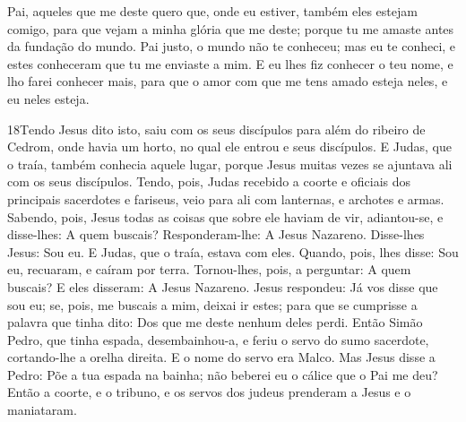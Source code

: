 Pai, aqueles que me deste quero que, onde eu estiver, também eles
estejam comigo, para que vejam a minha glória que me deste; porque
tu me amaste antes da fundação do mundo. Pai justo, o mundo
não te conheceu; mas eu te conheci, e estes conheceram que tu me
enviaste a mim. E eu lhes fiz conhecer o teu nome, e lho
farei conhecer mais, para que o amor com que me tens amado esteja
neles, e eu neles esteja.

\medskip

\lettrine{18} Tendo Jesus dito isto, saiu com os seus
discípulos para além do ribeiro de Cedrom, onde havia um horto, no
qual ele entrou e seus discípulos. E Judas, que o traía, também
conhecia aquele lugar, porque Jesus muitas vezes se ajuntava ali com
os seus discípulos. Tendo, pois, Judas recebido a coorte e
oficiais dos principais sacerdotes e fariseus, veio para ali com
lanternas, e archotes e armas. Sabendo, pois, Jesus todas as
coisas que sobre ele haviam de vir, adiantou-se, e disse-lhes: A
quem buscais? Responderam-lhe: A Jesus Nazareno. Disse-lhes
Jesus: Sou eu. E Judas, que o traía, estava com eles. Quando,
pois, lhes disse: Sou eu, recuaram, e caíram por terra.
Tornou-lhes, pois, a perguntar: A quem buscais? E eles disseram:
A Jesus Nazareno. Jesus respondeu: Já vos disse que sou eu; se,
pois, me buscais a mim, deixai ir estes; para que se cumprisse a
palavra que tinha dito: Dos que me deste nenhum deles perdi.
Então Simão Pedro, que tinha espada, desembainhou-a, e feriu
o servo do sumo sacerdote, cortando-lhe a orelha direita. E o nome
do servo era Malco. Mas Jesus disse a Pedro: Põe a tua espada
na bainha; não beberei eu o cálice que o Pai me deu? Então a
coorte, e o tribuno, e os servos dos judeus prenderam a Jesus e o
maniataram.

